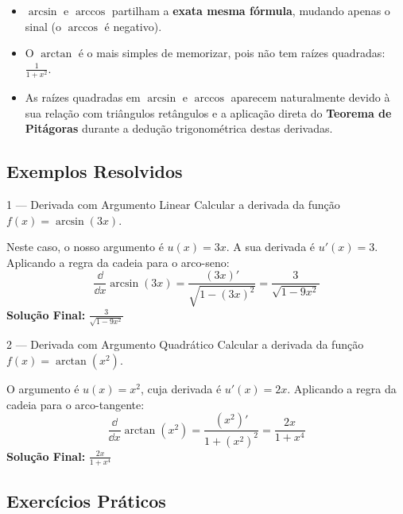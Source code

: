 \begin{notebox}[title={Dicas de Memorização e Origem Geométrica}]
  \begin{itemize}
      \item $\arcsin$ e $\arccos$ partilham a \textbf{exata mesma fórmula}, mudando apenas o sinal (o $\arccos$ é negativo).
      \item O $\arctan$ é o mais simples de memorizar, pois não tem raízes quadradas: \(\frac{1}{1+x^2}\).
      \item As raízes quadradas em $\arcsin$ e $\arccos$ aparecem naturalmente devido à sua relação com triângulos retângulos e a aplicação direta do \textbf{Teorema de Pitágoras} durante a dedução trigonométrica destas derivadas.
  \end{itemize}
\end{notebox}


\subsection{Exemplos Resolvidos}

\begin{exbox}{1 --- Derivada com Argumento Linear}
  Calcular a derivada da função $f(x) = \arcsin(3x)$.
\end{exbox}
\begin{solbox}
  Neste caso, o nosso argumento é $u(x) = 3x$. A sua derivada é $u'(x) = 3$.
  Aplicando a regra da cadeia para o arco-seno:
  \[
    \frac{\dd}{\dd x}\arcsin(3x) = \frac{(3x)'}{\sqrt{1-(3x)^2}} = \frac{3}{\sqrt{1-9x^2}}
  \]
  \textbf{Solução Final:} $\boxed{\frac{3}{\sqrt{1-9x^2}}}$
\end{solbox}

\begin{exbox}{2 --- Derivada com Argumento Quadrático}
  Calcular a derivada da função $f(x) = \arctan(x^2)$.
\end{exbox}
\begin{solbox}
  O argumento é $u(x) = x^2$, cuja derivada é $u'(x) = 2x$.
  Aplicando a regra da cadeia para o arco-tangente:
  \[
    \frac{\dd}{\dd x}\arctan(x^2) = \frac{(x^2)'}{1+(x^2)^2} = \frac{2x}{1+x^4}
  \]
  \textbf{Solução Final:} $\boxed{\frac{2x}{1+x^4}}$
\end{solbox}


\subsection{Exercícios Práticos}

